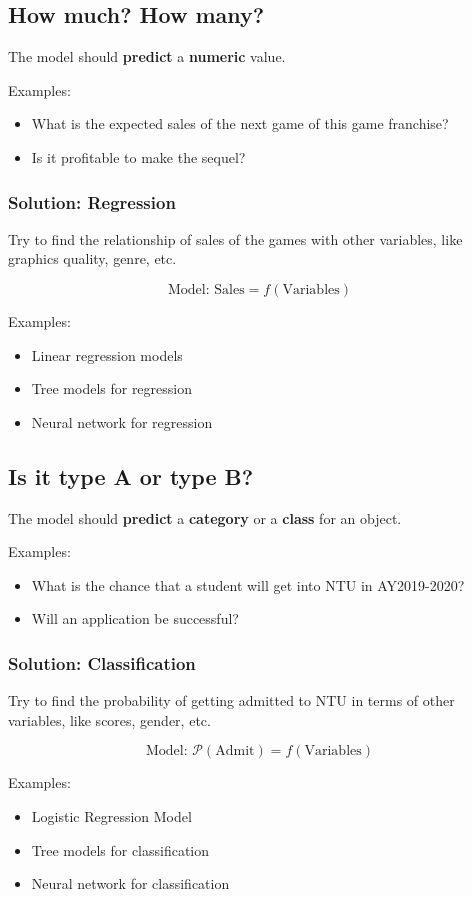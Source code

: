 \documentclass[11pt]{article}
\begin{document}
\subsection{How much? How many?}
\label{sec:org20fed12}
The model should \textbf{predict} a \textbf{numeric} value.

Examples:
\begin{itemize}
\item What is the expected sales of the next game of this game franchise?
\item Is it profitable to make the sequel?
\end{itemize}
\subsubsection{Solution: Regression}
\label{sec:org58bbfa4}
Try to find the relationship of sales of the games with other variables, like graphics quality, genre, etc.

\[\text{Model: } \text{Sales} = f(\text{Variables})\]

Examples:
\begin{itemize}
\item Linear regression models
\item Tree models for regression
\item Neural network for regression
\end{itemize}
\subsection{Is it type A or type B?}
\label{sec:orgd29f018}
The model should \textbf{predict} a \textbf{category} or a \textbf{class} for an object.

Examples:
\begin{itemize}
\item What is the chance that a student will get into NTU in AY2019-2020?
\item Will an application be successful?
\end{itemize}
\subsubsection{Solution: Classification}
\label{sec:org1564ed6}
Try to find the probability of getting admitted to NTU in terms of other variables, like scores, gender, etc.

\[\text{Model: } \mathcal{P} (\text{Admit}) = f(\text{Variables})\]

Examples:
\begin{itemize}
\item Logistic Regression Model
\item Tree models for classification
\item Neural network for classification
\end{itemize}
\end{document}
